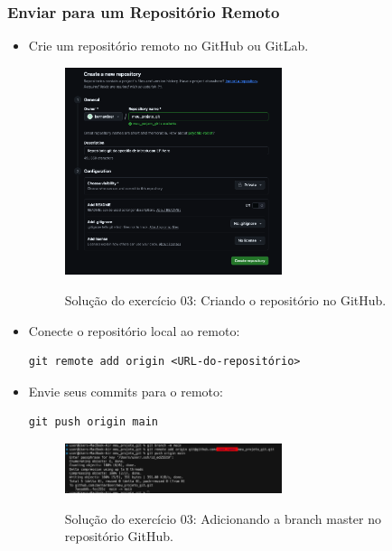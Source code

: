 \subsubsection{Enviar para um Repositório Remoto}
\begin{itemize}
    \item Crie um repositório remoto no GitHub ou GitLab.

    \begin{figure}[H]
        \centering
        \includegraphics[width=0.6\textwidth]{imgs/tutorial_github/ex03_01.png}
        \label{fig:ex03_01}
        \caption{Solução do exercício 03: Criando o repositório no GitHub.}
    \end{figure}
    
    \item Conecte o repositório local ao remoto:
    \begin{lstlisting}[style=shellstyle]
git remote add origin <URL-do-repositório>
    \end{lstlisting}

    
    \item Envie seus commits para o remoto:
    \begin{lstlisting}[style=shellstyle]
git push origin main
    \end{lstlisting}

    \begin{figure}[H]
        \centering
        \includegraphics[width=0.6\textwidth]{imgs/tutorial_github/ex03_03.png}
        \label{fig:ex03_02}
        \caption{Solução do exercício 03: Adicionando a branch master no repositório GitHub.}
    \end{figure}
\end{itemize}

